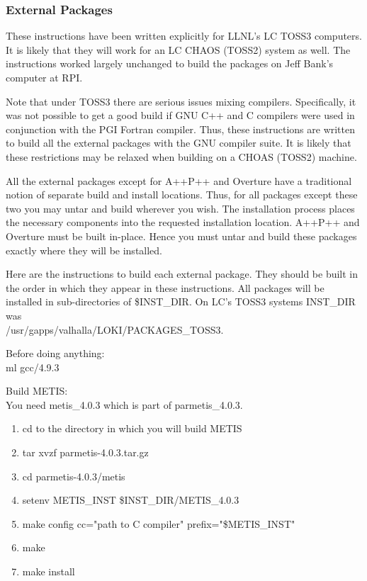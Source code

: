 \documentclass[11pt]{amsart}
\begin{document}
\subsubsection*{External Packages}
These instructions have been written explicitly for LLNL's LC TOSS3 computers.
It is likely that they will work for an LC CHAOS (TOSS2) system as well.  The
instructions worked largely unchanged to build the packages on Jeff Bank's
computer at RPI.

Note that under TOSS3 there are serious issues mixing compilers.  Specifically,
it was not possible to get a good build if GNU C++ and C compilers were used in
conjunction with the PGI Fortran compiler.  Thus, these instructions are
written to build all the external packages with the GNU compiler suite.  It is
likely that these restrictions may be relaxed when building on a CHOAS (TOSS2)
machine.

All the external packages except for A++P++ and Overture have a traditional
notion of separate build and install locations.  Thus, for all packages except
these two you may untar and build wherever you wish.  The installation process
places the necessary components into the requested installation location.
A++P++ and Overture must be built in-place.  Hence you must untar and build
these packages exactly where they will be installed.

Here are the instructions to build each external package.  They should be built
in the order in which they appear in these instructions.  All packages will
be installed in sub-directories of \$INST\_DIR.  On LC's TOSS3 systems
INST\_DIR was \\
/usr/gapps/valhalla/LOKI/PACKAGES\_TOSS3.

Before doing anything: \\
ml gcc/4.9.3

Build METIS: \\
You need metis\_4.0.3 which is part of parmetis\_4.0.3.
\begin{enumerate}
\item cd to the directory in which you will build METIS
\item tar xvzf parmetis-4.0.3.tar.gz
\item cd parmetis-4.0.3/metis
\item setenv METIS\_INST \$INST\_DIR/METIS\_4.0.3
\item make config cc="path to C compiler" prefix="\$METIS\_INST"
\item make
\item make install
\end{enumerate}
\end{document}
